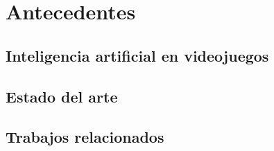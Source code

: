 \chapter{Antecedentes} \label{chap:antecedentes}

\section{Inteligencia artificial en videojuegos} \label{sec:ia_videojuegos}


\section{Estado del arte} \label{sec:estado_arte}

\section{Trabajos relacionados} \label{sec:trabajos_relacionados}

